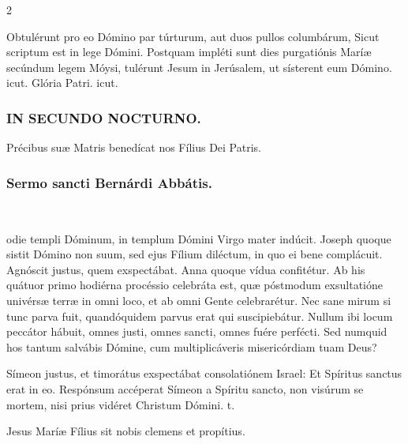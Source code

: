 \documentclass[9pt,twoside]{extarticle}
\begin{document}
\begin{multicols}{2}
\begin{tightlist}{}
\item {} Obtulérunt pro eo Dómino par túrturum, aut duos pullos columbárum, \textred{*} Sicut scriptum est in lege Dómini.  Postquam impléti sunt dies purgatiónis Maríæ secúndum legem Móysi, tulérunt Jesum in Jerúsalem, ut sísterent eum Dómino. icut. Glória Patri. icut.
\end{tightlist}

\subsubsection*{\center \textsc{IN SECUNDO NOCTURNO.}}
\begin{tightlist}{}
\item {\small {} Précibus suæ Matris benedícat nos Fílius Dei Patris.}
\end{tightlist}
\subsubsection*{\center Sermo sancti Bernárdi Abbátis.}
\begin{center}\\
\end{center}
odie templi Dóminum, in templum Dómini Virgo mater indúcit. Joseph quoque sistit Dómino non suum, sed ejus Fílium diléctum, in quo ei bene complácuit. Agnóscit justus, quem exspectábat. Anna quoque vídua confitétur. Ab his quátuor primo hodiérna procéssio celebráta est, quæ póstmodum exsultatióne univérsæ terræ in omni loco, et ab omni Gente celebrarétur. Nec sane mirum si tunc parva fuit, quandóquidem parvus erat qui suscipiebátur. Nullum ibi locum peccátor hábuit, omnes justi, omnes sancti, omnes fuére perfécti. Sed numquid hos tantum salvábis Dómine, cum multiplicáveris misericórdiam tuam Deus?

\begin{tightlist}{}
\item {} Símeon justus, et timorátus exspectábat consolatiónem Israel: \textred{*} Et Spíritus sanctus erat in eo.  Respónsum accéperat Símeon a Spíritu sancto, non visúrum se mortem, nisi prius vidéret Christum Dómini. t.
\item {\small {} Jesus Maríæ Fílius sit nobis clemens et propítius.}
\end{tightlist}


\end{multicols}
\end{document}
